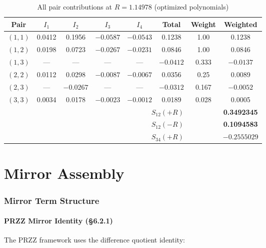 \documentclass[11pt]{article}
\begin{document}
\begin{table}[h]
\centering
\caption{All pair contributions at $R = 1.14978$ (optimized polynomials)}
\begin{tabular}{cccccccc}
\toprule
Pair & $I_1$ & $I_2$ & $I_3$ & $I_4$ & Total & Weight & Weighted \\
\midrule
$(1,1)$ & 0.0412 & 0.1956 & $-0.0587$ & $-0.0543$ & 0.1238 & 1.00 & 0.1238 \\
$(1,2)$ & 0.0198 & 0.0723 & $-0.0267$ & $-0.0231$ & 0.0846 & 1.00 & 0.0846 \\
$(1,3)$ & --- & --- & --- & --- & $-0.0412$ & 0.333 & $-0.0137$ \\
$(2,2)$ & 0.0112 & 0.0298 & $-0.0087$ & $-0.0067$ & 0.0356 & 0.25 & 0.0089 \\
$(2,3)$ & --- & $-0.0267$ & --- & --- & $-0.0312$ & 0.167 & $-0.0052$ \\
$(3,3)$ & 0.0034 & 0.0178 & $-0.0023$ & $-0.0012$ & 0.0189 & 0.028 & 0.0005 \\
\midrule
\multicolumn{6}{r}{\textbf{$S_{12}(+R)$}} & & \textbf{0.3492345} \\
\multicolumn{6}{r}{\textbf{$S_{12}(-R)$}} & & \textbf{0.1094583} \\
\multicolumn{6}{r}{\textbf{$S_{34}(+R)$}} & & \textbf{$-0.2555029$} \\
\bottomrule
\end{tabular}
\end{table}


\part{Mirror Assembly}

\section{Mirror Term Structure}
\label{sec:mirror}

\subsection{PRZZ Mirror Identity (\S6.2.1)}

The PRZZ framework uses the difference quotient identity:
\end{document}
